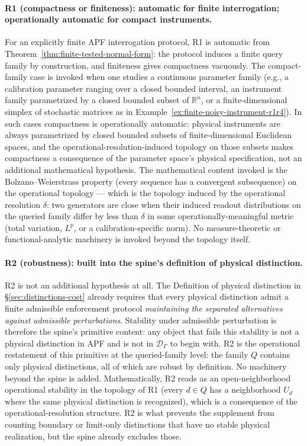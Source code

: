 \documentclass[11pt]{article}
\begin{document}
\paragraph{R1 (compactness or finiteness): automatic for finite interrogation; operationally automatic for compact instruments.}
For an explicitly finite APF interrogation protocol, R1 is automatic from Theorem~\ref{thm:finite-tested-normal-form}: the protocol induces a finite query family by construction, and finiteness gives compactness vacuously.  The compact-family case is invoked when one studies a continuous parameter family (e.g., a calibration parameter ranging over a closed bounded interval, an instrument family parametrized by a closed bounded subset of $\mathbb R^n$, or a finite-dimensional simplex of stochastic matrices as in Example~\ref{ex:finite-noisy-instrument-r1r4}).  In such cases compactness is operationally automatic: physical instruments are always parametrized by closed bounded subsets of finite-dimensional Euclidean spaces, and the operational-resolution-induced topology on those subsets makes compactness a consequence of the parameter space's physical specification, not an additional mathematical hypothesis.  The mathematical content invoked is the Bolzano--Weierstrass property (every sequence has a convergent subsequence) on the operational topology --- which is the topology induced by the operational resolution $\delta$: two generators are close when their induced readout distributions on the queried family differ by less than $\delta$ in some operationally-meaningful metric (total variation, $L^p$, or a calibration-specific norm).  No measure-theoretic or functional-analytic machinery is invoked beyond the topology itself.

\paragraph{R2 (robustness): built into the spine's definition of physical distinction.}
R2 is not an additional hypothesis at all.  The Definition of physical distinction in \S\ref{sec:distinctions-cost} already requires that every physical distinction admit a finite admissible enforcement protocol \emph{maintaining the separated alternatives against admissible perturbations}.  Stability under admissible perturbation is therefore the spine's primitive content: any object that fails this stability is not a physical distinction in APF and is not in $\mathcal D_\Gamma$ to begin with.  R2 is the operational restatement of this primitive at the queried-family level: the family $Q$ contains only physical distinctions, all of which are robust by definition.  No machinery beyond the spine is added.  Mathematically, R2 reads as an open-neighborhood operational stability in the topology of R1 (every $d \in Q$ has a neighborhood $U_d$ where the same physical distinction is recognized), which is a consequence of the operational-resolution structure.  R2 is what prevents the supplement from counting boundary or limit-only distinctions that have no stable physical realization, but the spine already excludes those.
\end{document}
